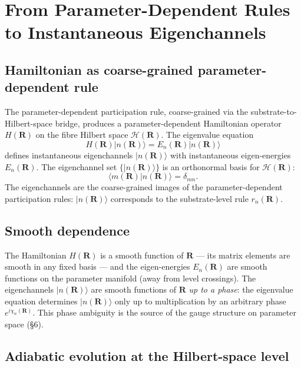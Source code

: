 \documentclass[11pt,a4paper]{article}
\begin{document}
\section{From Parameter-Dependent Rules to Instantaneous Eigenchannels}

\subsection{Hamiltonian as coarse-grained parameter-dependent rule}

The parameter-dependent participation rule, coarse-grained via the substrate-to-Hilbert-space bridge, produces a parameter-dependent Hamiltonian operator $H(\mathbf{R})$ on the fibre Hilbert space $\mathcal{H}(\mathbf{R})$. The eigenvalue equation
\[
H(\mathbf{R}) |n(\mathbf{R})\rangle = E_n(\mathbf{R}) |n(\mathbf{R})\rangle
\]
defines instantaneous eigenchannels $|n(\mathbf{R})\rangle$ with instantaneous eigen-energies $E_n(\mathbf{R})$. The eigenchannel set $\{|n(\mathbf{R})\rangle\}$ is an orthonormal basis for $\mathcal{H}(\mathbf{R})$:
\[
\langle m(\mathbf{R})|n(\mathbf{R})\rangle = \delta_{mn}.
\]
The eigenchannels are the coarse-grained images of the parameter-dependent participation rules: $|n(\mathbf{R})\rangle$ corresponds to the substrate-level rule $r_n(\mathbf{R})$.

\subsection{Smooth dependence}

The Hamiltonian $H(\mathbf{R})$ is a smooth function of $\mathbf{R}$ --- its matrix elements are smooth in any fixed basis --- and the eigen-energies $E_n(\mathbf{R})$ are smooth functions on the parameter manifold (away from level crossings). The eigenchannels $|n(\mathbf{R})\rangle$ are smooth functions of $\mathbf{R}$ \emph{up to a phase}: the eigenvalue equation determines $|n(\mathbf{R})\rangle$ only up to multiplication by an arbitrary phase $e^{i\chi_n(\mathbf{R})}$. This phase ambiguity is the source of the gauge structure on parameter space (\S6).

\subsection{Adiabatic evolution at the Hilbert-space level}
\end{document}
